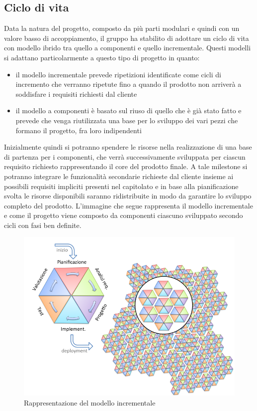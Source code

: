 	\subsection{Ciclo di vita} %
	Data la natura del progetto, composto da più parti modulari e quindi con un valore basso di accoppiamento, il gruppo ha stabilito di adottare un ciclo di vita con modello ibrido tra quello a componenti e quello incrementale.
	Questi modelli si adattano particolarmente a questo tipo di progetto in quanto:
	\begin{itemize}
		\item il modello incrementale prevede ripetizioni identificate come cicli di incremento che verranno ripetute fino a quando il prodotto non arriverà a soddisfare i requisiti richiesti dal cliente
		\item il modello a componenti è basato sul riuso di quello che è già stato fatto e prevede che venga riutilizzata una base per lo sviluppo dei vari pezzi che formano il progetto, fra loro indipendenti
	\end{itemize}
	Inizialmente quindi si potranno spendere le risorse nella realizzazione di una base di partenza per i componenti, che verrà successivamente sviluppata per ciascun requisito richiesto rappresentando il core del prodotto finale.
	A tale milestone si potranno integrare le funzionalità secondarie richieste dal cliente insieme ai possibili requisiti impliciti presenti nel capitolato e in base alla pianificazione svolta le risorse disponibili saranno ridistribuite in modo da garantire lo sviluppo completo del prodotto.
	L'immagine che segue rappresenta il modello incrementale e come il progetto viene composto da componenti ciascuno sviluppato secondo cicli con fasi ben definite.
	\begin{figure}[H]
		\centering
		\includegraphics[scale=0.5]{img/modello_incrementale.png}
		\caption{Rappresentazione del modello incrementale \protect\footnotemark}
	\end{figure}

	